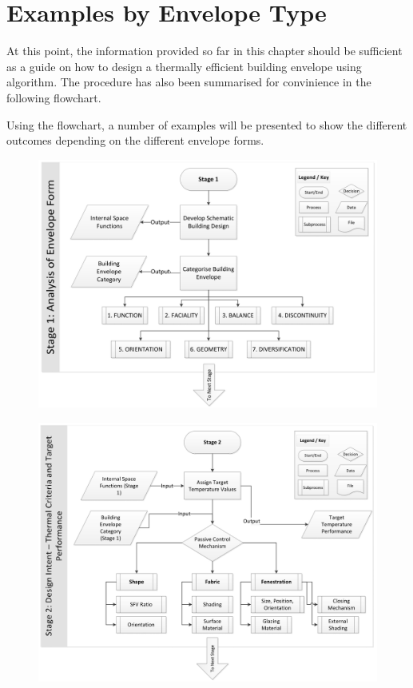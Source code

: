\clearpage
\section{Examples by Envelope Type}

At this point, the information provided so far in this chapter should be sufficient as a guide on how to design a thermally efficient building envelope using algorithm. The procedure has also been summarised for convinience in the following flowchart.

Using the flowchart, a number of examples will be presented to show the different outcomes depending on the different envelope forms.

\clearpage
\begin{figure}
	\centering
	\includegraphics[width=18cm]{./Images/9a-Flowchart}
\end{figure}

\begin{figure}
	\centering
	\includegraphics[width=18cm]{./Images/9b-Flowchart}
\end{figure}

